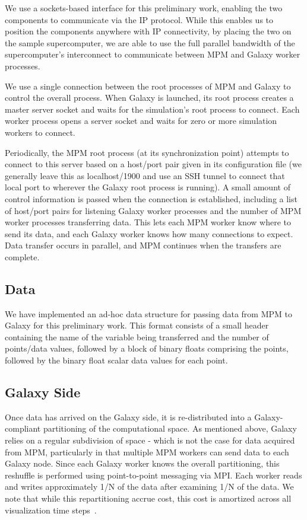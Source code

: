\documentclass[journal]{IEEEtran}
\begin{document}
We use a sockets-based interface for this preliminary work, enabling the two components to communicate via the IP protocol.  While this enables us to position the components anywhere with IP connectivity, by placing the two on the sample supercomputer, we are able to use the full parallel bandwidth of the supercomputer's interconnect to communicate between MPM and Galaxy worker processes.

We use a single connection between the root processes of MPM and Galaxy to control the overall process. When Galaxy is launched, its root process creates a master server socket and waits for the simulation's root process to connect. Each worker process opens a server socket and waits for zero or more simulation workers to connect.

Periodically, the MPM root process (at its synchronization point) attempts to connect to this server based on a host/port pair given in its configuration file (we generally leave this as localhost/1900 and use an SSH tunnel to connect that local port to wherever the Galaxy root process is running). A small amount of control information is passed when the connection is established, including a list of host/port pairs for listening Galaxy worker processes and the number of MPM worker processes transferring data. This lets each MPM worker know where to send its data, and each Galaxy worker knows how many connections to expect. Data transfer occurs in parallel, and MPM continues when the transfers are complete.

\subsection{Data}

We have implemented an ad-hoc data structure for passing data from MPM to Galaxy for this preliminary work.  This format consists of a small header containing the name of the variable being transferred and the number of points/data values, followed by a block of binary floats comprising the points, followed by the binary float scalar data values for each point.

\subsection{Galaxy Side}

Once data has arrived on the Galaxy side, it is re-distributed into a Galaxy-compliant partitioning of the computational space.  As mentioned above, Galaxy relies on a regular subdivision of space - which is not the case for data acquired from MPM, particularly in that multiple MPM workers can send data to each Galaxy node.  Since each Galaxy worker knows the overall partitioning, this reshuffle is performed using point-to-point messaging via MPI.  Each worker reads and writes approximately 1/N of the data after examining 1/N of the data.  We note that while this repartitioning accrue cost, this cost is amortized across all visualization time steps~\cite{abram2018galaxy}.
\end{document}
